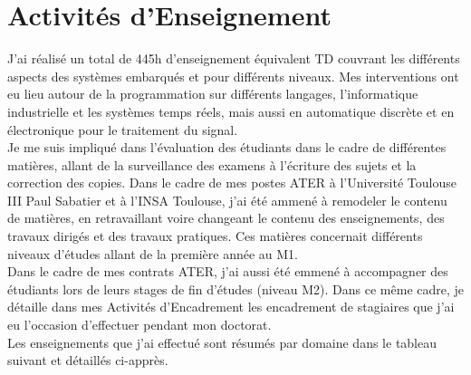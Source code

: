 \documentclass[11pt,a4paper,sans]{moderncv}         %
\begin{document}
\section{Activit\'es d'Enseignement}
J'ai réalisé un total de 445h d'enseignement équivalent TD couvrant les différents aspects des systèmes embarqués et pour différents niveaux. Mes interventions ont eu lieu autour de la programmation sur différents langages, l'informatique industrielle et les systèmes temps réels, mais aussi en automatique discrète et en électronique pour le traitement du signal.\\
Je me suis impliqué dans l'évaluation des étudiants dans le cadre de différentes matières, allant de la surveillance des examens à l'écriture des sujets et la correction des copies. Dans le cadre de mes postes ATER à l'Université Toulouse III Paul Sabatier et à l'INSA Toulouse, j'ai été ammené à remodeler le contenu de matières, en retravaillant voire changeant le contenu des enseignements, des travaux dirigés et des travaux pratiques. Ces matières concernait différents niveaux d'études allant de la première année au M1.\\
Dans le cadre de mes contrats ATER, j'ai aussi été emmené à accompagner des étudiants lors de leurs stages de fin d'études (niveau M2). Dans ce même cadre, je détaille dans mes Activités d'Encadrement les encadrement de stagiaires que j'ai eu l'occasion d'effectuer pendant mon doctorat.\\
Les enseignements que j'ai effectué sont résumés par domaine dans le tableau suivant et détaillés ci-apprès.\\
\end{document}
